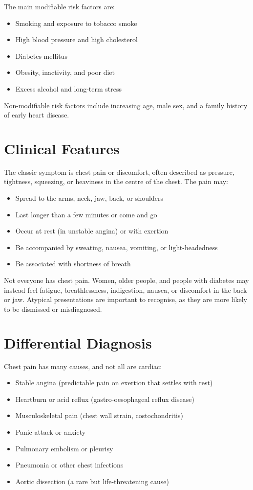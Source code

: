 The main modifiable risk factors are:

\begin{itemize}
    \item Smoking and exposure to tobacco smoke
    \item High blood pressure and high cholesterol
    \item Diabetes mellitus
    \item Obesity, inactivity, and poor diet
    \item Excess alcohol and long-term stress
\end{itemize}

Non-modifiable risk factors include increasing age, male sex, and a family history of early heart disease.

\section*{Clinical Features}
The classic symptom is chest pain or discomfort, often described as pressure, tightness, squeezing, or heaviness in the centre of the chest. The pain may:

\begin{itemize}
    \item Spread to the arms, neck, jaw, back, or shoulders
    \item Last longer than a few minutes or come and go
    \item Occur at rest (in unstable angina) or with exertion
    \item Be accompanied by sweating, nausea, vomiting, or light-headedness
    \item Be associated with shortness of breath
\end{itemize}

Not everyone has chest pain. Women, older people, and people with diabetes may instead feel fatigue, breathlessness, indigestion, nausea, or discomfort in the back or jaw. Atypical presentations are important to recognise, as they are more likely to be dismissed or misdiagnosed.

\section*{Differential Diagnosis}
Chest pain has many causes, and not all are cardiac:

\begin{itemize}
    \item Stable angina (predictable pain on exertion that settles with rest)
    \item Heartburn or acid reflux (gastro-oesophageal reflux disease)
    \item Musculoskeletal pain (chest wall strain, costochondritis)
    \item Panic attack or anxiety
    \item Pulmonary embolism or pleurisy
    \item Pneumonia or other chest infections
    \item Aortic dissection (a rare but life-threatening cause)
\end{itemize}


